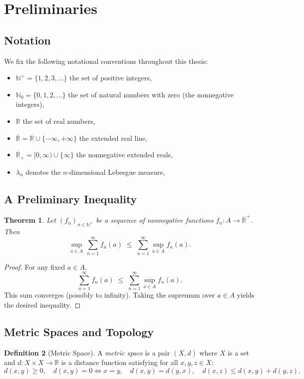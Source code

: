 \documentclass{article}
\theoremstyle{plain}
\newtheorem{thm}{Theorem}[section]
\theoremstyle{definition}
\newtheorem{defn}[thm]{Definition}
\theoremstyle{remark}
\begin{document}

\section{Preliminaries}

\subsection*{Notation}
We fix the following notational conventions throughout this thesis:
\begin{itemize}
  \item $\mathbb{N}^+ = \{1,2,3,\dots\}$ the set of positive integers,
  \item $\mathbb{N}_0 = \{0,1,2,\dots\}$ the set of natural numbers with zero (the nonnegative integers),
  \item $\mathbb{R}$ the set of real numbers,
  \item $\overline{\mathbb{R}} = \mathbb{R}\cup\{-\infty,+\infty\}$ the extended real line,
  \item $\overline{\mathbb{R}}_+ = [0, \infty) \cup \{\infty\}$ the nonnegative extended reals,
  \item $\lambda_n$ denotes the $n$-dimensional Lebesgue measure,
\end{itemize}

\subsection*{A Preliminary Inequality}
\begin{thm} \label{thm:sub}
Let $(f_n)_{n \in \mathbb{N}^+}$ be a sequence of nonnegative functions $f_n:A\to \overline{\mathbb{R}}^+$. Then
\[
\sup_{a\in A}\,\sum_{n=1}^\infty f_n(a) \;\le\; \sum_{n=1}^\infty \sup_{a\in A} f_n(a).
\]
\end{thm}
\begin{proof}
For any fixed $a\in A$,
\[
\sum_{n=1}^\infty f_n(a) \;\le\; \sum_{n=1}^\infty \sup_{a\in A} f_n(a).
\]
This sum converges (possibly to infinity). Taking the supremum over $a\in A$ yields the desired inequality.
\end{proof}

\subsection*{Metric Spaces and Topology}
\begin{defn}[Metric Space]
A \emph{metric space} is a pair $(X,d)$ where $X$ is a set and $d:X\times X\to\mathbb R$ is a distance function satisfying for all $x,y,z\in X$: 
\[
d(x,y)\ge 0,\quad d(x,y)=0\iff x=y,\quad d(x,y)=d(y,x),\quad d(x,z)\le d(x,y)+d(y,z).
\] 
\end{defn}
\end{document}
